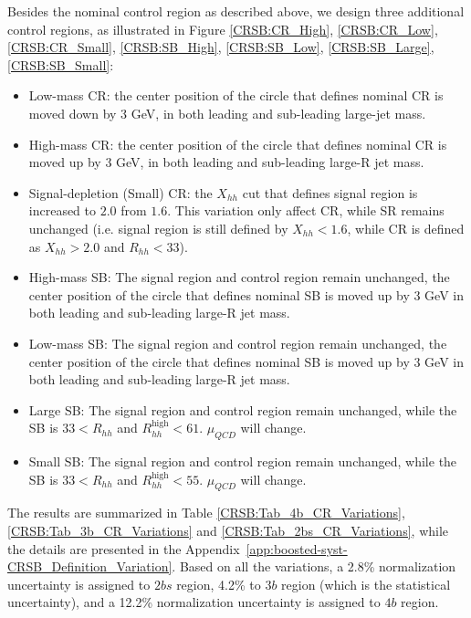 Besides the nominal control region as described above, we design three additional control regions, as illustrated in Figure \ref{CRSB:CR_High}, \ref{CRSB:CR_Low}, \ref{CRSB:CR_Small}, \ref{CRSB:SB_High}, \ref{CRSB:SB_Low}, \ref{CRSB:SB_Large}, \ref{CRSB:SB_Small}:
\begin{itemize}
	\item Low-mass CR: the center position of the circle that defines nominal CR is moved down by 3 GeV, in both leading and sub-leading large-jet mass.
	\item High-mass CR: the center position of the circle that defines nominal CR is moved up by 3 GeV, in both leading and sub-leading large-R jet mass.
	\item Signal-depletion (Small) CR: the $X_{hh}$ cut that defines signal region is increased to $2.0$ from $1.6$. This variation only affect CR, while SR remains unchanged (i.e. signal region is still defined by $X_{hh}<1.6$, while CR is defined as $X_{hh}>2.0$ and $R_{hh}<33$).
	\item High-mass SB: The signal region and control region remain unchanged, the center position of the circle that defines nominal SB is moved up by 3 GeV in both leading and sub-leading large-R jet mass.
	\item Low-mass SB: The signal region and control region remain unchanged, the center position of the circle that defines nominal SB is moved up by 3 GeV in both leading and sub-leading large-R jet mass.
	\item Large SB: The signal region and control region remain unchanged, while the SB is $33 < R_{hh}$ and $ R_{hh}^{\text{high}} < 61$. $\mu_{QCD}$ will change.
	\item Small SB: The signal region and control region remain unchanged, while the SB is $33 < R_{hh}$ and $ R_{hh}^{\text{high}} < 55$. $\mu_{QCD}$ will change.
\end{itemize}

The results are summarized in Table \ref{CRSB:Tab_4b_CR_Variations}, \ref{CRSB:Tab_3b_CR_Variations} and \ref{CRSB:Tab_2bs_CR_Variations}, while the details are presented in the Appendix~\ref{app:boosted-syst-CRSB_Definition_Variation}. Based on all the variations, a 2.8\% normalization uncertainty is assigned to $2bs$ region, 4.2\% to $3b$ region (which is the statistical uncertainty), and a 12.2\% normalization uncertainty is assigned to $4b$ region.

